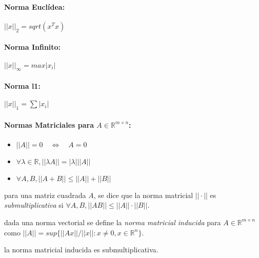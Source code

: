 \hypertarget{norma-eucluxeddea}{%
\paragraph{Norma Euclídea:}\label{norma-eucluxeddea}}

\(||x||_2 = sqrt(x^T x)\)

\hypertarget{norma-infinito}{%
\paragraph{Norma Infinito:}\label{norma-infinito}}

\(||x||_\infty = max |x_i|\)

\hypertarget{norma-l1}{%
\paragraph{Norma l1:}\label{norma-l1}}

\(||x||_1 = \sum |x_i|\)

\hypertarget{normas-matriciales-para-a-in-ensuremathmathbbrm-times-n}{%
\paragraph{\texorpdfstring{Normas Matriciales para
\(A \in \ensuremath{\mathbb{R}}^{m \times n}\):}{Normas Matriciales para A \textbackslash{}in \textbackslash{}ensuremath\{\textbackslash{}mathbb\{R\}\}\^{}\{m \textbackslash{}times n\}:}}\label{normas-matriciales-para-a-in-ensuremathmathbbrm-times-n}}

\begin{itemize}
\tightlist
\item
  \(||A|| = 0 \ensuremath{\quad\Longleftrightarrow\quad}A = 0\)
\item
  \(\forall \lambda \in \ensuremath{\mathbb{R}}, ||\lambda A|| = |\lambda| ||A||\)
\item
  \(\forall A,B, ||A+B|| \leq ||A|| + ||B||\)
\end{itemize}

\Definicion para una matriz cuadrada \(A\), se dice que la norma
matricial \(||\cdot||\) es \emph{submultiplicativa} si
\(\forall A, B, ||AB|| \leq ||A|| \cdot ||B||\).

\Definicion dada una norma vectorial se define la \emph{norma matricial
inducida} para \(A \in \ensuremath{\mathbb{R}}^{m \times n}\) como
\(||A|| = sup\{ ||Ax|| / ||x|| : x \neq 0, x \in \ensuremath{\mathbb{R}}^n \}\).

\Teorema la norma matricial inducida es submultiplicativa.

